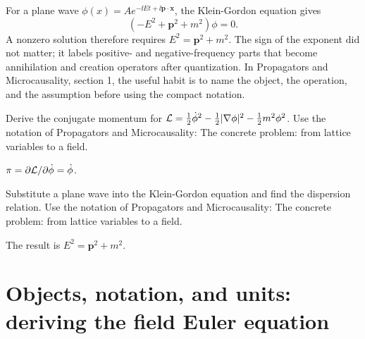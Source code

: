 \begin{example}
For a plane wave \(\phi(x)=Ae^{-\ii Et+\ii\bm p\cdot\bm x}\), the Klein-Gordon equation gives
\[
  (-E^2+\bm p^2+m^2)\phi=0.
\]
A nonzero solution therefore requires \(E^2=\bm p^2+m^2\).  The sign of the exponent did not matter; it labels positive- and negative-frequency parts that become annihilation and creation operators after quantization.  In Propagators and Microcausality, section 1, the useful habit is to name the object, the operation, and the assumption before using the compact notation.
\end{example}



\begin{exercise}
Derive the conjugate momentum for \(\mathcal L=\frac12\dot\phi^2-\frac12|\nabla\phi|^2-\frac12m^2\phi^2\).  Use the notation of Propagators and Microcausality: The concrete problem: from lattice variables to a field.
\begin{answer}
\(\pi=\partial\mathcal L/\partial\dot\phi=\dot\phi\).
\end{answer}
\end{exercise}

\begin{exercise}
Substitute a plane wave into the Klein-Gordon equation and find the dispersion relation.  Use the notation of Propagators and Microcausality: The concrete problem: from lattice variables to a field.
\begin{answer}
The result is \(E^2=\bm p^2+m^2\).
\end{answer}
\end{exercise}



\section{Objects, notation, and units: deriving the field Euler equation}













